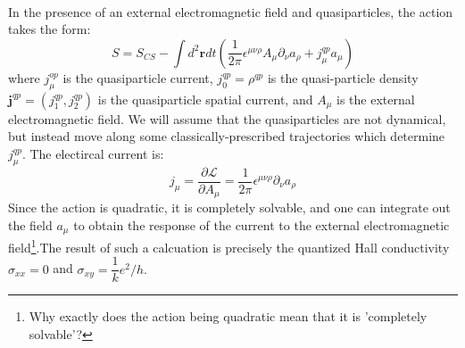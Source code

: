    \paragraph{} In the presence of an external electromagnetic field and quasiparticles, the action takes the form:
   \begin{equation}\label{20}
    S = S_{CS} - \int d^2\mathbf{r}dt \left(\dfrac{1}{2\pi}\epsilon^{\mu\nu\rho}A_{\mu}\partial_{\nu}a_{\rho} + j_{\mu}^{qp}a_{\mu} \right)
   \end{equation}
where $j^{op}_{\mu}$ is the quasiparticle current, $j_{0}^{qp}= \rho^{qp}$ is the quasi-particle density $\mathbf{j}^{qp} = 
(j_{1}^{qp}, j_{2}^{qp})$ is the quasiparticle spatial current, and $A_{\mu}$ is the external electromagnetic field. We will
assume that the quasiparticles are not dynamical, but instead move along some classically-prescribed trajectories which
determine $j_{\mu}^{qp}$. The electircal current is:
\begin{equation}\label{21}
 j_{\mu} = \dfrac{\partial\mathcal{L}}{\partial A_{\mu}} = \dfrac{1}{2\pi} \epsilon^{\mu \nu \rho}\partial_{\nu}a_{\rho}
\end{equation}
Since the action is quadratic, it is completely solvable, and one can integrate out the field $a_{\mu}$ to obtain the response
of the current to the external electromagnetic field\footnote{Why exactly does the action being quadratic mean that it is 
'completely solvable'?}.The result of such a calcuation is precisely the quantized Hall conductivity 
$\sigma_{xx} = 0$ and $\sigma_{xy} = \dfrac{1}{k} e^{2}/h.$
